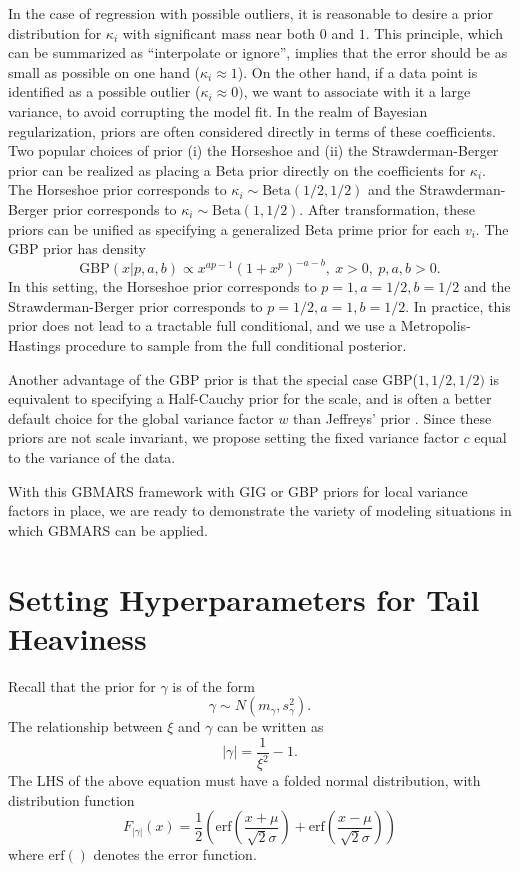 \documentclass{article} %
\begin{document}
In the case of regression with possible outliers, it is reasonable to desire a prior distribution for $\kappa_i$ with significant mass near both $0$ and $1$. This principle, which can be summarized as ``interpolate or ignore'', implies that the error should be as small as possible on one hand ($\kappa_i \approx 1$). On the other hand, if a data point is identified as a possible outlier ($\kappa_i \approx 0)$, we want to associate with it a large variance, to avoid corrupting the model fit. In the realm of Bayesian regularization, priors are often considered directly in terms of these coefficients. Two popular choices of prior (i) the Horseshoe and (ii) the Strawderman-Berger prior can be realized as placing a Beta prior directly on the coefficients for $\kappa_i$. The Horseshoe prior corresponds to $\kappa_i \sim \text{Beta}(1/2, 1/2)$ and the Strawderman-Berger prior corresponds to $\kappa_i \sim \text{Beta}(1, 1/2)$. After transformation, these priors can be unified as specifying a generalized Beta prime \citep{mcdonald1995generalization} prior for each $v_i$. The GBP prior has density
$$\text{GBP}(x|p,a,b) \propto x^{ap-1}(1+x^p)^{-a-b}, \ x > 0, \ p,a,b > 0.$$
In this setting, the Horseshoe prior corresponds to $p=1, a=1/2, b=1/2$ and the Strawderman-Berger prior corresponds to $p=1/2, a=1, b=1/2$. In practice, this prior does not lead to a tractable full conditional, and we use a Metropolis-Hastings procedure to sample from the full conditional posterior. %

Another advantage of the GBP prior is that the special case GBP($1, 1/2, 1/2)$ is equivalent to specifying a Half-Cauchy prior for the scale, and is often a better default choice for the global variance factor $w$ than Jeffreys' prior \citep{gelman2006prior}. Since these priors are not scale invariant, we propose setting the fixed variance factor $c$ equal to the variance of the data. 

With this GBMARS framework with GIG or GBP priors for local variance factors in place, we are ready to demonstrate the variety of modeling situations in which GBMARS can be applied.

\section{Setting Hyperparameters for Tail Heaviness}
\label{sec:smhyper}

Recall that the prior for $\gamma$ is of the form 
$$\gamma \sim N\left(m_\gamma, s_\gamma^2\right).$$
The relationship between $\xi$ and $\gamma$ can be written as
\begin{equation}
    \label{eq:smxi}
    |\gamma| = \frac{1}{\xi^2} - 1.
\end{equation}
The LHS of the above equation must have a folded normal distribution, with distribution function
$$F_{|\gamma|}(x) = \frac{1}{2}\left(\text{erf}\left(\frac{x+\mu}{\sqrt 2\sigma} \right) + \text{erf}\left(\frac{x-\mu}{\sqrt 2\sigma}\right) \right)$$
where $\text{erf}()$ denotes the error function.
\end{document}
